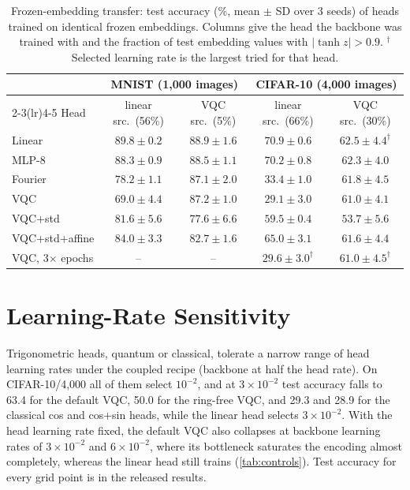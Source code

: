\begin{table}[h]
\centering
\caption{Frozen-embedding transfer: test accuracy (\%, mean $\pm$ SD over 3 seeds) of heads
trained on identical frozen embeddings. Columns give the head the backbone was trained with
and the fraction of test embedding values with $|\tanh z|>0.9$. $^\dagger$Selected learning
rate is the largest tried for that head.}
\label{tab:frozen}
\small
\begin{tabular}{lcccc}
\toprule
& \multicolumn{2}{c}{MNIST (1,000 images)} & \multicolumn{2}{c}{CIFAR-10 (4,000 images)} \\
\cmidrule(lr){2-3}\cmidrule(lr){4-5}
Head & linear src.\ (56\%) & VQC src.\ (5\%) & linear src.\ (66\%) & VQC src.\ (30\%) \\
\midrule
Linear          & $89.8 \pm 0.2$ & $88.9 \pm 1.6$ & $70.9 \pm 0.6$ & $62.5 \pm 4.4^\dagger$ \\
MLP-8           & $88.3 \pm 0.9$ & $88.5 \pm 1.1$ & $70.2 \pm 0.8$ & $62.3 \pm 4.0$ \\
Fourier         & $78.2 \pm 1.1$ & $87.1 \pm 2.0$ & $33.4 \pm 1.0$ & $61.8 \pm 4.5$ \\
VQC             & $69.0 \pm 4.4$ & $87.2 \pm 1.0$ & $29.1 \pm 3.0$ & $61.0 \pm 4.1$ \\
VQC+std         & $81.6 \pm 5.6$ & $77.6 \pm 6.6$ & $59.5 \pm 0.4$ & $53.7 \pm 5.6$ \\
VQC+std+affine  & $84.0 \pm 3.3$ & $82.7 \pm 1.6$ & $65.0 \pm 3.1$ & $61.6 \pm 4.4$ \\
VQC, 3$\times$ epochs & -- & -- & $29.6 \pm 3.0^\dagger$ & $61.0 \pm 4.5^\dagger$ \\
\bottomrule
\end{tabular}
\end{table}

\section{Learning-Rate Sensitivity}
\label{app:lr}

Trigonometric heads, quantum or classical, tolerate a narrow range of head learning rates under
the coupled recipe (backbone at half the head rate). On CIFAR-10/4,000 all of them select
$10^{-2}$, and at $3\times10^{-2}$ test accuracy falls to 63.4 for the default VQC, 50.0 for
the ring-free VQC, and 29.3 and 28.9 for the classical cos and cos+sin heads, while the linear
head selects $3\times10^{-2}$. With the head learning rate fixed, the default VQC also
collapses at backbone learning rates of $3\times10^{-2}$ and $6\times10^{-2}$, where its
bottleneck saturates the encoding almost completely, whereas the linear head still trains
(\cref{tab:controls}). Test accuracy for every grid point is in the released results.


